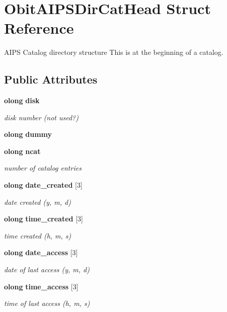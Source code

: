 \section{Obit\-AIPSDir\-Cat\-Head Struct Reference}
\label{structObitAIPSDirCatHead}
AIPS Catalog directory structure This is at the beginning of a catalog.  


\subsection*{Public Attributes}
\begin{CompactItemize}
\item 
{\bf olong} {\bf disk}
\begin{CompactList}\small\item\em disk number (not used?) \item\end{CompactList}\item 
{\bf olong} {\bf dummy}
\item 
{\bf olong} {\bf ncat}
\begin{CompactList}\small\item\em number of catalog entries \item\end{CompactList}\item 
{\bf olong} {\bf date\_\-created} [3]
\begin{CompactList}\small\item\em date created (y, m, d) \item\end{CompactList}\item 
{\bf olong} {\bf time\_\-created} [3]
\begin{CompactList}\small\item\em time created (h, m, s) \item\end{CompactList}\item 
{\bf olong} {\bf date\_\-access} [3]
\begin{CompactList}\small\item\em date of last access (y, m, d) \item\end{CompactList}\item 
{\bf olong} {\bf time\_\-access} [3]
\begin{CompactList}\small\item\em time of last access (h, m, s) \item\end{CompactList}\end{CompactItemize}


